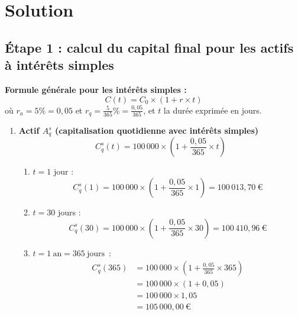 \documentclass{article}
\begin{document}
\newpage
\section{Solution}
\subsection*{Étape 1 : calcul du capital final pour les actifs à intérêts simples}

\noindent
\textbf{Formule générale pour les intérêts simples :}
\[
    C(t) = C_0 \times \left(1 + r \times t\right)
\]
où $r_a = 5\% = 0,05$ et \( r_q = \frac{5}{365}\% = \frac{0,05}{365} \), et \( t \) la durée exprimée en jours.

\begin{enumerate}[label=\textbf{R1.\arabic*}]
    \item \textbf{Actif \( A_q^s \) (capitalisation quotidienne avec intérêts simples)}
          \[
              C_q^s(t) = 100\,000 \times \left(1 + \frac{0,05}{365} \times t\right)
          \]
          \begin{enumerate}[label=(\alph*)]
              \item \( t = 1 \) jour : 
                    \[
                        C_q^s(1) = 100\,000 \times \left(1 + \frac{0,05}{365} \times 1\right) = \boxed{100\,013,70\ \text{€}}
                    \]
                            
              \item $t = 30$ jours : 
                    \[
                        C_q^s(30) = 100\,000 \times \left(1 + \frac{0,05}{365} \times 30\right) = \boxed{100\,410,96\ \text{€}}
                    \]
                            
              \item $t = 1\ \text{an} = 365\ \text{jours}$~: 
                    \begin{align*}
                        C_q^s(365) & = 100\,000 \times \left(1 + \frac{0,05}{365} \times 365\right) \\
                                   & = 100\,000 \times (1 + 0,05)                                   \\
                                   & = 100\,000 \times 1,05                                         \\
                                   & = \boxed{105\,000,00\ \text{€}}                              
                    \end{align*}
                            

\end{enumerate}
\end{enumerate}
\end{document}
